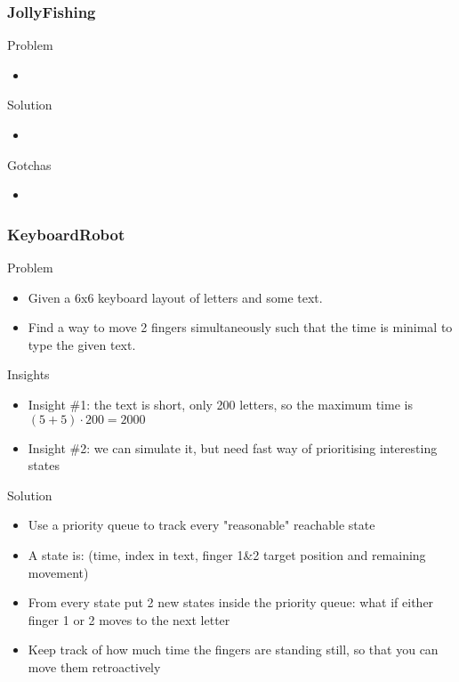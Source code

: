\documentclass{beamer}
\begin{document}
\begin{frame}
    \frametitle{JollyFishing}
    \begin{block}{Problem}
        \begin{itemize}
            \item 
        \end{itemize}
    \end{block}
    \begin{block}{Solution}
        \begin{itemize}
            \item 
        \end{itemize}
    \end{block}
    \begin{block}{Gotchas}
        \begin{itemize}
            \item 
        \end{itemize}
    \end{block}
\end{frame}

\begin{frame}
    \frametitle{KeyboardRobot}
    \begin{block}{Problem}
        \begin{itemize}
            \item Given a 6x6 keyboard layout of letters and some text.
            \item Find a way to move 2 fingers simultaneously such that the time is minimal to type the given text.
        \end{itemize}
    \end{block}
    \begin{block}{Insights}
        \begin{itemize}
            \item Insight \#1: the text is short, only 200 letters, so the maximum time is $(5+5)\cdot200 = 2000$
            \item Insight \#2: we can simulate it, but need fast way of prioritising interesting states
        \end{itemize}
    \end{block}
    \begin{block}{Solution}
        \begin{itemize}
            \item Use a priority queue to track every "reasonable" reachable state
            \item A state is: (time, index in text, finger 1\&2 target position and remaining movement)
            \item From every state put 2 new states inside the priority queue: what if either finger 1 or 2 moves to the next letter
            \item Keep track of how much time the fingers are standing still, so that you can move them retroactively
        \end{itemize}
    \end{block}
\end{frame}
\end{document}
